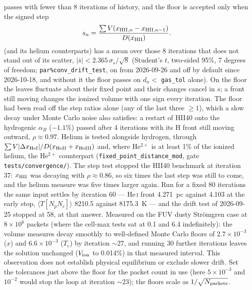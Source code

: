 \documentclass[english,a4paper]{my_memo}
\newcommand{\code}[1]{\texttt{#1}}
\begin{document}
passes with fewer than 8 iterations of history, and the floor is accepted
only when the signed step
\begin{equation}
  s_n = \frac{\sum V(x_{{\rm HII},n}-x_{{\rm HII},n-1})}{D(x_{\rm HII})}.
\end{equation}
(and its helium counterparts) has a mean over those 8 iterations that does
not stand out of its scatter, $|\bar s| < 2.365\,\sigma_s/\sqrt{8}$ (Student's
$t$, two-sided 95\%, 7 degrees of freedom; \code{par\%conv\_drift\_test},
on from 2026-09-26 and off by default since 2026-10-18, and without it the
floor passes on $d_n <$ \code{gas\_tol} alone).  On the floor the leaves
fluctuate about their fixed point and their changes cancel in $s$; a front
still moving changes the ionized volume with one sign every iteration.  The
floor had been read off the step ratios alone (any of the last three
$\ge 1$), which a slow decay under Monte Carlo noise also satisfies: a
restart of HII40 onto the hydrogenic $\alpha_B$ ($-1.1\%$) passed after 4
iterations with its H front still moving outward, $\rho \approx 0.97$.  Helium
is tested alongside hydrogen, through
$\sum V|\Delta x_{\rm HeI}|/D(x_{\rm HeII}+x_{\rm HeIII})$ and, where He$^{2+}$ is at
least 1\% of the ionized helium, the He$^{2+}$ counterpart
(\code{fixed\_point\_distance\_mod}, gate \code{tests/convergence/}).  The
step test stopped the HII40 benchmark at iteration 37: $x_{\rm HII}$ was
decaying with $\rho \approx 0.86$, so six times the last step was still to
come, and the helium measure was five times larger again.  Run for a fixed
80 iterations the same input settles by iteration 60 --- He\,\textsc{i}
front 4.271~pc against 4.103 at the early stop, $\langle T[N_pN_e]\rangle$
8210.5 against 8175.3~K --- and the drift test of 2026-09-25 stopped at
58, at that answer.
Measured on the FUV dusty Str\"omgren case at $8{\times}10^6$ packets
(where the cell-max tests sat at 0.1 and 6.4 indefinitely): the volume
measures decay smoothly to well-defined Monte Carlo floors of
$2.7{\times}10^{-3}$ ($x$) and $6.6{\times}10^{-3}$ ($T_e$) by
iteration $\sim$27, and running 30 further iterations leaves the
solution unchanged ($V_{\rm ion}$ to 0.014\%) in that measured interval.
This observation does not establish physical equilibrium or exclude slower drift.  Set the tolerances just above the floor for the packet
count in use (here $5{\times}10^{-3}$ and $10^{-2}$ would stop the
loop at iteration $\sim$23); the floors scale as
$1/\sqrt{N_{\rm packets}}$.
\end{document}

